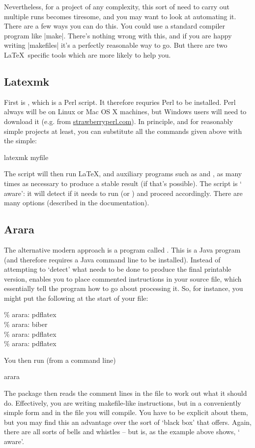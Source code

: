 Nevertheless, for a project of any complexity, this sort of need to
carry out multiple runs becomes tiresome, and you may want to look at
automating it. There are a few ways you can do this. You could use a
standard compiler program like |make|. There's nothing wrong with
this, and if you are happy writing |makefiles| it's a perfectly
reasonable way to go. But there are two \LaTeX\ specific tools which
are more likely to help you.

\subsection{Latexmk}

First is , which is a Perl script. It therefore
requries Perl to be installed. Perl always will be on Linux or Mac OS X
machines, but Windows users will need to download it (e.g. from
\url{strawberryperl.com}). In principle, and for reasonably simple
projects at least, you can substitute all the commands given above
with the simple:
\begin{pseudoverb}
latexmk myfile
\end{pseudoverb}
The script will then run \LaTeX, and auxiliary programs such as
 and , as many times as necessary to
produce a stable result (if that's possible). The 
script is ` aware': it will detect if it needs to run
 (or \bibtex) and proceed accordingly. There are many
options (described in the documentation).

\subsection{Arara}

The alternative modern approach is a program called
. This is a Java program (and therefore requires a Java
command line to be installed). Instead of attempting to `detect' what
needs to be done to produce the final printable version,
 enables you to place commented instructions in your
source file, which essentially tell the program how to go about
processing it. So, for instance, you might put the following at the
start of your file:
\begin{pseudoverb}
\% arara: pdflatex\\
\% arara: biber\\
\% arara: pdflatex\\
\% arara: pdflatex
\end{pseudoverb}
You then run (from a command line)
\begin{pseudoverb}
arara 
\end{pseudoverb}
The package then reads the comment lines in the file to work out what
it should do. Effectively, you are writing makefile-like instructions,
but in a conveniently simple form and in the file you will
compile. You have to be explicit about them, but you may find this an
advantage over the sort of `black box' that 
offers. Again, there are all sorts of bells and whistles -- but
 is, as the example above shows, `
aware'.

